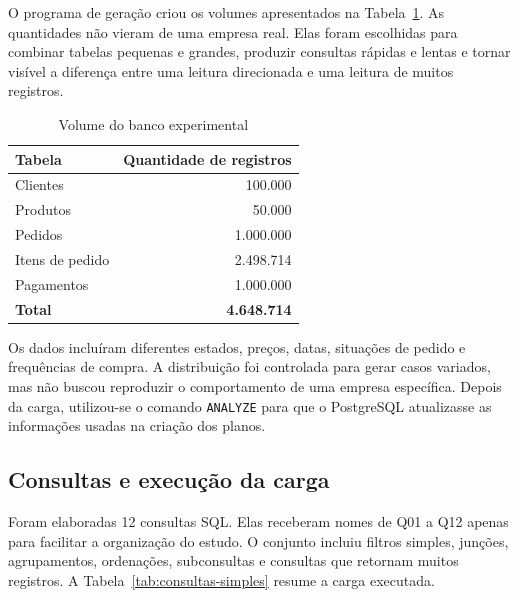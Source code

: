O programa de geração criou os volumes apresentados na Tabela~\ref{tab:volumes-simples}. As quantidades não vieram de uma empresa real. Elas foram escolhidas para combinar tabelas pequenas e grandes, produzir consultas rápidas e lentas e tornar visível a diferença entre uma leitura direcionada e uma leitura de muitos registros.

\begin{table}[H]
\centering
\caption{Volume do banco experimental}
\label{tab:volumes-simples}
\begin{tabular}{lr}
\toprule
\textbf{Tabela} & \textbf{Quantidade de registros} \\
\midrule
Clientes & 100.000 \\
Produtos & 50.000 \\
Pedidos & 1.000.000 \\
Itens de pedido & 2.498.714 \\
Pagamentos & 1.000.000 \\
\midrule
\textbf{Total} & \textbf{4.648.714} \\
\bottomrule
\end{tabular}
\fonteautor
\end{table}

Os dados incluíram diferentes estados, preços, datas, situações de pedido e frequências de compra. A distribuição foi controlada para gerar casos variados, mas não buscou reproduzir o comportamento de uma empresa específica. Depois da carga, utilizou-se o comando \texttt{ANALYZE} para que o PostgreSQL atualizasse as informações usadas na criação dos planos.

\subsection{Consultas e execução da carga}

Foram elaboradas 12 consultas SQL. Elas receberam nomes de Q01 a Q12 apenas para facilitar a organização do estudo. O conjunto incluiu filtros simples, junções, agrupamentos, ordenações, subconsultas e consultas que retornam muitos registros. A Tabela~\ref{tab:consultas-simples} resume a carga executada.

